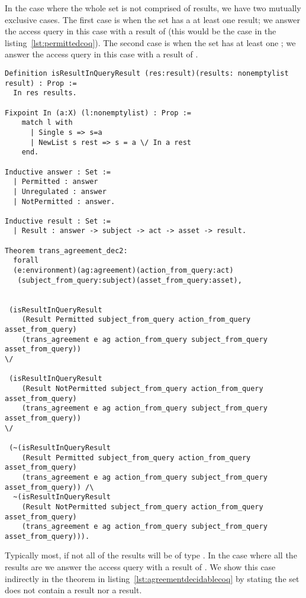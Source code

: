 In the case where the whole set is not comprised of  results, we have two mutually exclusive cases. The first case is when the set has a at least one  result; we answer the access query in this case with a result of  (this would be the case in the listing~\ref{lst:permittedcoq}). The second case is when the set has at least one ; we answer the access query in this case with a result of . 


\begin{lstlisting}
Definition isResultInQueryResult (res:result)(results: nonemptylist result) : Prop :=
  In res results.

Fixpoint In (a:X) (l:nonemptylist) : Prop :=
    match l with
      | Single s => s=a
      | NewList s rest => s = a \/ In a rest
    end.

Inductive answer : Set :=
  | Permitted : answer
  | Unregulated : answer
  | NotPermitted : answer.

Inductive result : Set :=
  | Result : answer -> subject -> act -> asset -> result.

Theorem trans_agreement_dec2:
  forall
  (e:environment)(ag:agreement)(action_from_query:act)
   (subject_from_query:subject)(asset_from_query:asset),


 (isResultInQueryResult 
    (Result Permitted subject_from_query action_from_query asset_from_query)
    (trans_agreement e ag action_from_query subject_from_query asset_from_query)) 
\/

 (isResultInQueryResult 
    (Result NotPermitted subject_from_query action_from_query asset_from_query)
    (trans_agreement e ag action_from_query subject_from_query asset_from_query))
\/

 (~(isResultInQueryResult 
    (Result Permitted subject_from_query action_from_query asset_from_query)
    (trans_agreement e ag action_from_query subject_from_query asset_from_query)) /\
  ~(isResultInQueryResult 
    (Result NotPermitted subject_from_query action_from_query asset_from_query)
    (trans_agreement e ag action_from_query subject_from_query asset_from_query))).

\end{lstlisting}

Typically most, if not all of the results will be of type . In the case where all the results are  we answer the access query with a result of . We show this case indirectly in the theorem in listing~\ref{lst:agreementdecidablecoq} by stating the set does not contain a  result nor a  result. 

